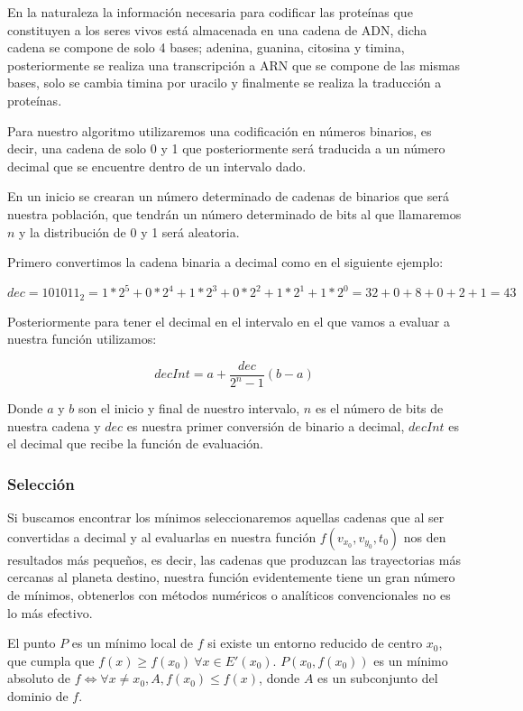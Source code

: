 \documentclass[12pt,letterpaper]{article}
\begin{document}
En la naturaleza la información necesaria para codificar las proteínas que constituyen a los seres vivos está almacenada en una cadena de ADN, dicha cadena se compone de solo 4 bases; adenina, guanina, citosina y timina, posteriormente se realiza una transcripción a ARN que se compone de las mismas bases, solo se cambia timina por uracilo y finalmente se realiza la traducción a proteínas. 

Para nuestro algoritmo utilizaremos una codificación en números binarios, es decir, una cadena de solo 0 y 1 que posteriormente será traducida a un número decimal que se encuentre dentro de un intervalo dado.

En un inicio se crearan un número determinado de cadenas de binarios que será nuestra población, que tendrán un número determinado de bits al que llamaremos $n$ y la distribución de 0 y 1 será aleatoria.

Primero convertimos la cadena binaria a decimal como en el siguiente ejemplo:

\[
dec=101011_2=1*2^5+0*2^4+1*2^3+0*2^2+1*2^1+1*2^0=32+0+8+0+2+1=43
\]

Posteriormente para tener el decimal en el intervalo en el que vamos a evaluar a nuestra función utilizamos:

\begin{equation}
decInt=a+\dfrac{dec}{2^n-1}(b-a)
\end{equation}

Donde $a$ y $b$ son el inicio y final de nuestro intervalo, $n$ es el número de bits de nuestra cadena y $dec$ es nuestra primer conversión de binario a decimal, $decInt$ es el decimal que recibe la función de evaluación.

\subsubsection*{Selección}

Si buscamos encontrar los mínimos seleccionaremos aquellas cadenas que al ser convertidas a decimal y al evaluarlas en nuestra función $f(v_{x_0},v_{y_0},t_0)$ nos den resultados más pequeños, es decir, las cadenas que produzcan las trayectorias más cercanas al planeta destino, nuestra función evidentemente tiene un gran número de mínimos, obtenerlos con métodos numéricos o analíticos convencionales no es lo más efectivo.

El punto $P$ es un mínimo local de $f$ si existe un entorno reducido de centro $x_0$, que cumpla que $f(x)\geq f(x_0) \ \forall x \in E'(x_0)$. $P(x_0,f(x_0))$ es un mínimo absoluto de $ f \Longleftrightarrow \forall x \neq x_0, A, f(x_0)\leqslant f(x)$, donde $A$ es un subconjunto del dominio de $f$.
\end{document}
